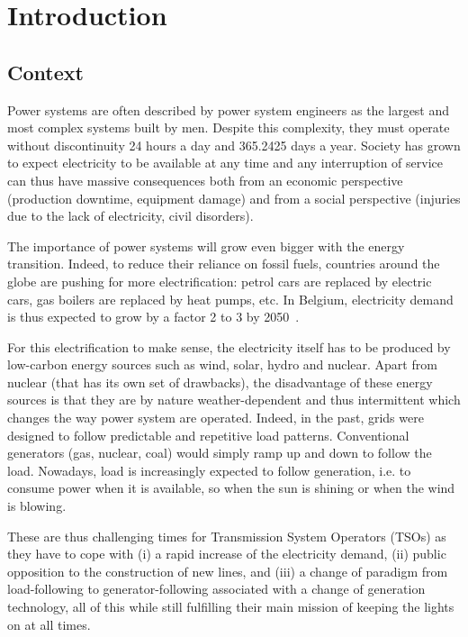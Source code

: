 \chapter{Introduction}
\section{Context}

Power systems are often described by power system engineers as the largest and most complex systems built by men. Despite this complexity, they must operate without discontinuity 24 hours a day and 365.2425 days a year. Society has grown to expect electricity to be available at any time and any interruption of service can thus have massive consequences both from an economic perspective (production downtime, equipment damage) and from a social perspective (injuries due to the lack of electricity, civil disorders).

The importance of power systems will grow even bigger with the energy transition. Indeed, to reduce their reliance on fossil fuels, countries around the globe are pushing for more electrification: petrol cars are replaced by electric cars, gas boilers are replaced by heat pumps, etc. In Belgium, electricity demand is thus expected to grow by a factor 2 to 3 by 2050~\cite{FES_in_5}.

For this electrification to make sense, the electricity itself has to be produced by low-carbon energy sources such as wind, solar, hydro and nuclear. Apart from nuclear (that has its own set of drawbacks), the disadvantage of these energy sources is that they are by nature weather-dependent and thus intermittent which changes the way power system are operated. Indeed, in the past, grids were designed to follow predictable and repetitive load patterns. Conventional generators (gas, nuclear, coal) would simply ramp up and down to follow the load. Nowadays, load is increasingly expected to follow generation, i.e. to consume power when it is available, so when the sun is shining or when the wind is blowing.

These are thus challenging times for Transmission System Operators (TSOs) as they have to cope with (i) a rapid increase of the electricity demand, (ii) public opposition to the construction of new lines, and (iii) a change of paradigm from load-following to generator-following associated with a change of generation technology, all of this while still fulfilling their main mission of keeping the lights on at all times.

